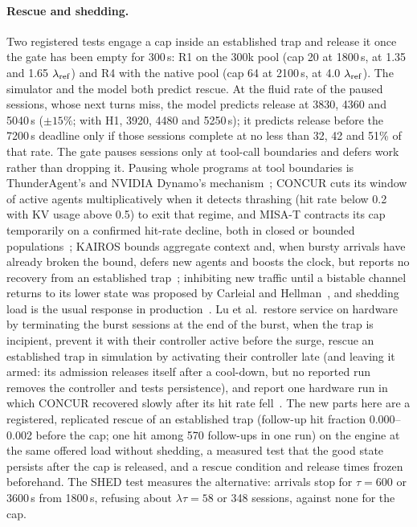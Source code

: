 \paragraph{Rescue and shedding.} Two registered tests engage a cap inside an established trap and release it once the gate has been empty for 300\,s: R1 on the 300k pool (cap 20 at 1800\,s, at 1.35 and 1.65 $\lambda_{\mathrm{ref}}$) and R4 with the native pool (cap 64 at 2100\,s, at 4.0 $\lambda_{\mathrm{ref}}$). The simulator and the model both predict rescue. At the fluid rate of the paused sessions, whose next turns miss, the model predicts release at 3830, 4360 and 5040\,s ($\pm15\%$; with H1, 3920, 4480 and 5250\,s); it predicts release before the 7200\,s deadline only if those sessions complete at no less than 32, 42 and 51\% of that rate. The gate pauses sessions only at tool-call boundaries and defers work rather than dropping it. Pausing whole programs at tool boundaries is ThunderAgent's and NVIDIA Dynamo's mechanism~\citep{kang2026thunderagent,dhanani2026dynamo}; CONCUR cuts its window of active agents multiplicatively when it detects thrashing (hit rate below 0.2 with KV usage above 0.5) to exit that regime, and MISA-T contracts its cap temporarily on a confirmed hit-rate decline, both in closed or bounded populations~\citep{chen2026concur,hong2026misat}; KAIROS bounds aggregate context and, when bursty arrivals have already broken the bound, defers new agents and boosts the clock, but reports no recovery from an established trap~\citep{yuan2026kairos}; inhibiting new traffic until a bistable channel returns to its lower state was proposed by Carleial and Hellman~\citep{carleial1975bistable}, and shedding load is the usual response in production~\citep{huang2022metastable}. Lu et al.\ restore service on hardware by terminating the burst sessions at the end of the burst, when the trap is incipient, prevent it with their controller active before the surge, rescue an established trap in simulation by activating their controller late (and leaving it armed: its admission releases itself after a cool-down, but no reported run removes the controller and tests persistence), and report one hardware run in which CONCUR recovered slowly after its hit rate fell~\citep{lu2026cachetrap}. The new parts here are a registered, replicated rescue of an established trap (follow-up hit fraction 0.000--0.002 before the cap; one hit among 570 follow-ups in one run) on the engine at the same offered load without shedding, a measured test that the good state persists after the cap is released, and a rescue condition and release times frozen beforehand. The SHED test measures the alternative: arrivals stop for $\tau=600$ or 3600\,s from 1800\,s, refusing about $\lambda\tau=58$ or 348 sessions, against none for the cap.


